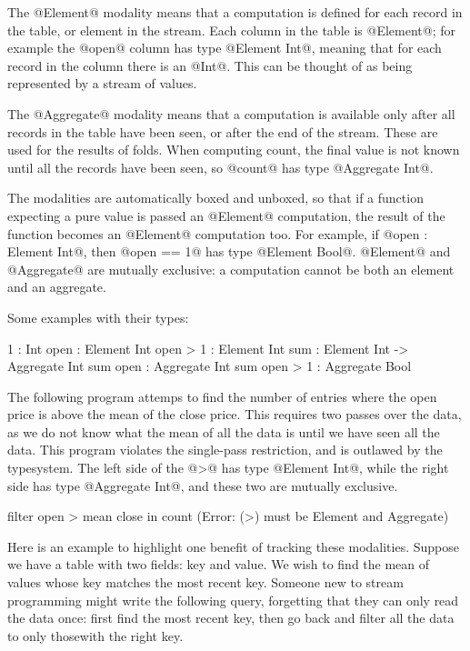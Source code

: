 The @Element@ modality means that a computation is defined for each record in the table, or element in the stream.
Each column in the table is @Element@; for example the @open@ column has type @Element Int@, meaning that for each record in the column there is an @Int@.
This can be thought of as being represented by a stream of values.

The @Aggregate@ modality means that a computation is available only after all records in the table have been seen, or after the end of the stream.
These are used for the results of folds.
When computing count, the final value is not known until all the records have been seen, so @count@ has type @Aggregate Int@.

The modalities are automatically boxed and unboxed, so that if a function expecting a pure value is passed an @Element@ computation, the result of the function becomes an @Element@ computation too.
For example, if @open : Element Int@, then @open == 1@ has type @Element Bool@.
@Element@ and @Aggregate@ are mutually exclusive: a computation cannot be both an element and an aggregate.

Some examples with their types:
\begin{code}
1             :         Int
open          : Element Int
open > 1      : Element Int
sum           : Element Int -> Aggregate Int
sum open      : Aggregate Int
sum open > 1  : Aggregate Bool
\end{code}

The following program attemps to find the number of entries where the open price is above the mean of the close price.
This requires two passes over the data, as we do not know what the mean of all the data is until we have seen all the data.
This program violates the single-pass restriction, and is outlawed by the typesystem.
The left side of the @>@ has type @Element Int@, while the right side has type @Aggregate Int@, and these two are mutually exclusive.
\begin{code}
filter open > mean close
in count
(Error: (>) must be Element and Aggregate)
\end{code}



Here is an example to highlight one benefit of tracking these modalities.
Suppose we have a table with two fields: key and value.
We wish to find the mean of values whose key matches the most recent key.
Someone new to stream programming might write the following query, forgetting that they can only read the data once: first find the most recent key, then go back and filter all the data to only thosewith the right key.

